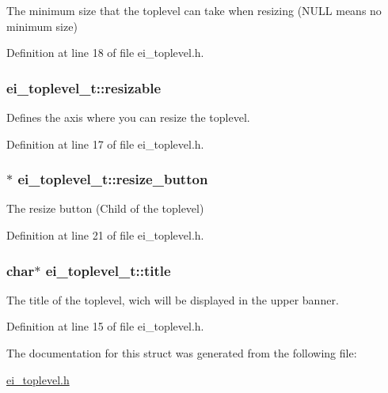 The minimum size that the toplevel can take when resizing (N\+U\+L\+L means no minimum size) 



Definition at line 18 of file ei\+\_\+toplevel.\+h.

\hypertarget{structei__toplevel__t_a20ca606f2d466eaab1996942d989f11b}{
\subsubsection[{resizable}]{ ei\+\_\+toplevel\+\_\+t\+::resizable}}\label{structei__toplevel__t_a20ca606f2d466eaab1996942d989f11b}


Defines the axis where you can resize the toplevel. 



Definition at line 17 of file ei\+\_\+toplevel.\+h.

\hypertarget{structei__toplevel__t_a417d86f20456e1e21b57f9665b5409c8}{
\subsubsection[{resize\+\_\+button}]{$\ast$ ei\+\_\+toplevel\+\_\+t\+::resize\+\_\+button}}\label{structei__toplevel__t_a417d86f20456e1e21b57f9665b5409c8}


The resize button (Child of the toplevel) 



Definition at line 21 of file ei\+\_\+toplevel.\+h.

\hypertarget{structei__toplevel__t_ad3b3d6a03d225a21c7b414357c678b1b}{
\subsubsection[{title}]{\setlength{\rightskip}{0pt plus 5cm}char$\ast$ ei\+\_\+toplevel\+\_\+t\+::title}}\label{structei__toplevel__t_ad3b3d6a03d225a21c7b414357c678b1b}


The title of the toplevel, wich will be displayed in the upper banner. 



Definition at line 15 of file ei\+\_\+toplevel.\+h.



The documentation for this struct was generated from the following file\+:\begin{DoxyCompactItemize}
\item 
\hyperlink{ei__toplevel_8h}{ei\+\_\+toplevel.\+h}\end{DoxyCompactItemize}
